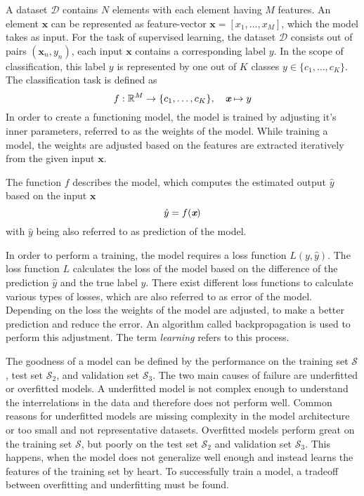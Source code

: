 A dataset $\mathcal{D}$ contains $N$ elements with each element having $M$ features.
An element $\textbf{x}$ can be represented as feature-vector $\textbf{x} = [x_1, \dots ,x_M]$, which the model takes as input.
For the task of supervised learning, the dataset $\mathcal{D}$ consists out of pairs $(\textbf{x}_n, y_n)$, each input $\textbf{x}$ contains a corresponding label $y$.
In the scope of classification, this label $y$ is represented by one out of $K$ classes $y \in \lbrace c_1, \dots, c_K \rbrace$.
The classification task is defined as  
\begin{equation}
	f: \mathbb{R}^M \rightarrow \lbrace c_1,\ldots,c_K \rbrace, \quad \textit{\textbf{x}} \mapsto y
\end{equation}
In order to create a functioning model, the model is trained by adjusting it's inner parameters, referred to as the weights of the model.
While training a model, the weights are adjusted based on the features are extracted iteratively from the given input $\textbf{x}$.

The function $f$ describes the model, which computes the estimated output $\hat{y}$ based on the input $\textbf{x}$
\begin{equation}
	\hat y = f(\textit{\textbf{x}})
\end{equation}
with $\hat{y}$ being also referred to as prediction of the model.

In order to perform a training, the model requires a loss function $L(y,\hat{y})$.
The loss function $L$ calculates the loss of the model based on the difference of the prediction $\hat{y}$ and the true label $y$.
There exist different loss functions to calculate various types of losses, which are also referred to as error of the model.
Depending on the loss the weights of the model are adjusted, to make a better prediction and reduce the error.
An algorithm called backpropagation is used to perform this adjustment.
The term \textit{learning} refers to this process.

The goodness of a model can be defined by the performance on the training set $\mathcal{S}$, test set $\mathcal{S}_2$, and validation set $\mathcal{S}_3$.
The two main causes of failure are underfitted or overfitted models.
A underfitted model is not complex enough to understand the interrelations in the data and therefore does not perform well.
Common reasons for underfitted models are missing complexity in the model architecture or too small and not representative datasets.
Overfitted models perform great on the training set $\mathcal{S}$, but poorly on the test set $\mathcal{S}_2$ and validation set $\mathcal{S}_3$.
This happens, when the model does not generalize well enough and instead learns the features of the training set by heart.
To successfully train a model, a tradeoff between overfitting and underfitting must be found.

